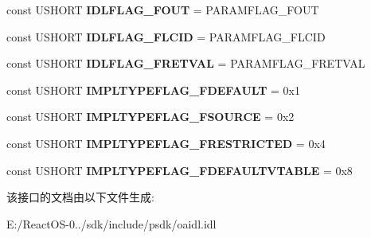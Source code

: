 \begin{DoxyCompactItemize}
const U\+S\+H\+O\+RT {\bfseries I\+D\+L\+F\+L\+A\+G\+\_\+\+F\+O\+UT} = P\+A\+R\+A\+M\+F\+L\+A\+G\+\_\+\+F\+O\+UT
\item 
\mbox{\label{interface_i_ole_automation_types_a5c2bc119e2b9a627cb2b94e4843acd1f}} 
const U\+S\+H\+O\+RT {\bfseries I\+D\+L\+F\+L\+A\+G\+\_\+\+F\+L\+C\+ID} = P\+A\+R\+A\+M\+F\+L\+A\+G\+\_\+\+F\+L\+C\+ID
\item 
\mbox{\label{interface_i_ole_automation_types_abb1be5e673cfcc6dd7d348e7a1a50100}} 
const U\+S\+H\+O\+RT {\bfseries I\+D\+L\+F\+L\+A\+G\+\_\+\+F\+R\+E\+T\+V\+AL} = P\+A\+R\+A\+M\+F\+L\+A\+G\+\_\+\+F\+R\+E\+T\+V\+AL
\item 
\mbox{\label{interface_i_ole_automation_types_aaf67c6bc3b6df88dacfadf258960c6f9}} 
const U\+S\+H\+O\+RT {\bfseries I\+M\+P\+L\+T\+Y\+P\+E\+F\+L\+A\+G\+\_\+\+F\+D\+E\+F\+A\+U\+LT} = 0x1
\item 
\mbox{\label{interface_i_ole_automation_types_a30377f31a60dc4430fa5bf4403062952}} 
const U\+S\+H\+O\+RT {\bfseries I\+M\+P\+L\+T\+Y\+P\+E\+F\+L\+A\+G\+\_\+\+F\+S\+O\+U\+R\+CE} = 0x2
\item 
\mbox{\label{interface_i_ole_automation_types_a61c595a2b960a1a40e358ef9dd1bd483}} 
const U\+S\+H\+O\+RT {\bfseries I\+M\+P\+L\+T\+Y\+P\+E\+F\+L\+A\+G\+\_\+\+F\+R\+E\+S\+T\+R\+I\+C\+T\+ED} = 0x4
\item 
\mbox{\label{interface_i_ole_automation_types_ae588f49874acad21759faf7982aa462b}} 
const U\+S\+H\+O\+RT {\bfseries I\+M\+P\+L\+T\+Y\+P\+E\+F\+L\+A\+G\+\_\+\+F\+D\+E\+F\+A\+U\+L\+T\+V\+T\+A\+B\+LE} = 0x8
\end{DoxyCompactItemize}


该接口的文档由以下文件生成\+:\begin{DoxyCompactItemize}
\item 
E\+:/\+React\+O\+S-\/0../sdk/include/psdk/oaidl.\+idl\end{DoxyCompactItemize}
